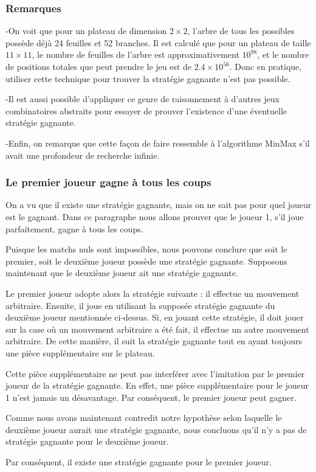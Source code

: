 \subsubsection{Remarques}
-On voit que pour un plateau de dimension $2\times2$, l'arbre de tous les possibles possède déjà 24 feuilles et 52 branches.
Il est calculé que pour un plateau de taille $11\times11$, le nombre de feuilles de l'arbre est
approximativement $10^{98}$, et le nombre de positions totales que peut prendre le jeu est de $2.4\times10^{56}$.
Donc en pratique, utiliser cette technique pour trouver la stratégie gagnante n'est pas possible.

-Il est aussi possible d'appliquer ce genre de raisonnement à d'autres jeux combinatoires abstraits pour essayer de
prouver l'existence d'une éventuelle stratégie gagnante.

-Enfin, on remarque que cette façon de faire ressemble à l'algorithme MinMax s'il avait une profondeur de recherche
infinie.


\subsubsection{Le premier joueur gagne à tous les coups}
On a vu que il existe une stratégie gagnante, mais on ne sait pas pour quel joueur est le gagnant. Dans ce paragraphe nous allons
prouver que le joueur 1, s'il joue parfaitement, gagne à tous les coups.

Puisque les matchs nuls sont impossibles, nous pouvons conclure que soit le premier, soit le deuxième joueur possède une stratégie
gagnante. Supposons maintenant que le deuxième joueur ait une stratégie gagnante.

Le premier joueur adopte alors la stratégie suivante : il effectue un mouvement arbitraire. Ensuite, 
il joue en utilisant la supposée stratégie gagnante du deuxième joueur mentionnée ci-dessus. Si,
en jouant cette stratégie, il doit jouer sur la case où un mouvement arbitraire a été fait, il effectue
un autre mouvement arbitraire. De cette manière, il suit la stratégie gagnante tout en ayant toujours une pièce
supplémentaire sur le plateau.

Cette pièce supplémentaire ne peut pas interférer avec l'imitation par le premier joueur de la stratégie gagnante.
En effet, une pièce supplémentaire pour le joueur 1 n'est jamais un désavantage. Par conséquent, le premier joueur peut
gagner.

Comme nous avons maintenant contredit notre hypothèse selon laquelle le deuxième joueur aurait une stratégie gagnante,
nous concluons qu'il n'y a pas de stratégie gagnante pour le deuxième joueur.

Par conséquent, il existe une stratégie gagnante pour le premier joueur.